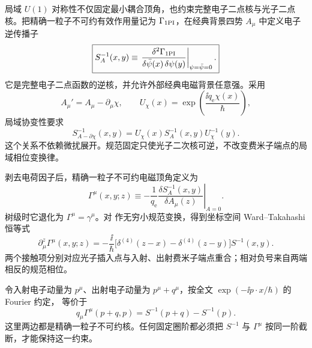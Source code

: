 
局域 $U(1)$ 对称性不仅固定最小耦合顶角，也约束完整电子二点核与光子二点核。把精确一粒子不可约有效作用量记为 $\Gamma_{\rm 1PI}$，在经典背景四势 $A_\mu$ 中定义电子逆传播子
\begin{equation}
\boxed{
S_A^{-1}(x,y)
\equiv
\left.
\frac{\delta^2\Gamma_{\rm 1PI}}
{\delta\bar\psi(x)\,\delta\psi(y)}
\right|_{\psi=\bar\psi=0}.}
\label{eq:qed_background_inverse_propagator_definition}
\end{equation}
它是完整电子二点函数的逆核，并允许外部经典电磁背景任意强。采用
\[
A_\mu' = A_\mu-\partial_\mu\chi,
\qquad
U_\chi(x)=\exp\!\left(\frac{\ii q_{\mathrm e}\chi(x)}{\hbar}\right),
\]
局域协变性要求
\begin{equation}
\boxed{
S_{A-\partial\chi}^{-1}(x,y)
=U_\chi(x)S_A^{-1}(x,y)U_\chi^{-1}(y).}
\label{eq:qed_inverse_propagator_gauge_covariance}
\end{equation}
这个关系不依赖微扰展开。规范固定只使光子二次核可逆，不改变费米子端点的局域相位变换律。

剥去电荷因子后，精确一粒子不可约电磁顶角定义为
\begin{equation}
\boxed{
\Gamma^\mu(x,y;z)
\equiv
-\frac{1}{q_{\mathrm e}}
\left.
\frac{\delta S_A^{-1}(x,y)}{\delta A_\mu(z)}
\right|_{A=0}.}
\label{eq:qed_exact_vertex_functional_definition}
\end{equation}
树级时它退化为 $\Gamma^\mu=\gamma^\mu$。对 作无穷小规范变换，得到坐标空间 Ward--Takahashi 恒等式
\begin{equation}
\boxed{
\partial_\mu^z\Gamma^\mu(x,y;z)
=-\frac{\ii}{\hbar}
\bigl[\delta^{(4)}(z-x)-\delta^{(4)}(z-y)\bigr]
S^{-1}(x,y).}
\label{eq:qed_ward_takahashi_coordinate}
\end{equation}
两个接触项分别对应光子插入点与入射、出射费米子端点重合；相对负号来自两端相反的规范相位。

令入射电子动量为 $p^\mu$、出射电子动量为 $p^\mu+q^\mu$，按全文 $\exp(-\ii p\cdot x/\hbar)$ 的 Fourier 约定， 等价于
\begin{equation}
\boxed{
q_\mu\Gamma^\mu(p+q,p)
=S^{-1}(p+q)-S^{-1}(p).}
\label{eq:qed_ward_takahashi_momentum}
\end{equation}
这里两边都是精确一粒子不可约核。任何固定圈阶都必须把 $S^{-1}$ 与 $\Gamma^\mu$ 按同一阶截断，才能保持这一约束。

